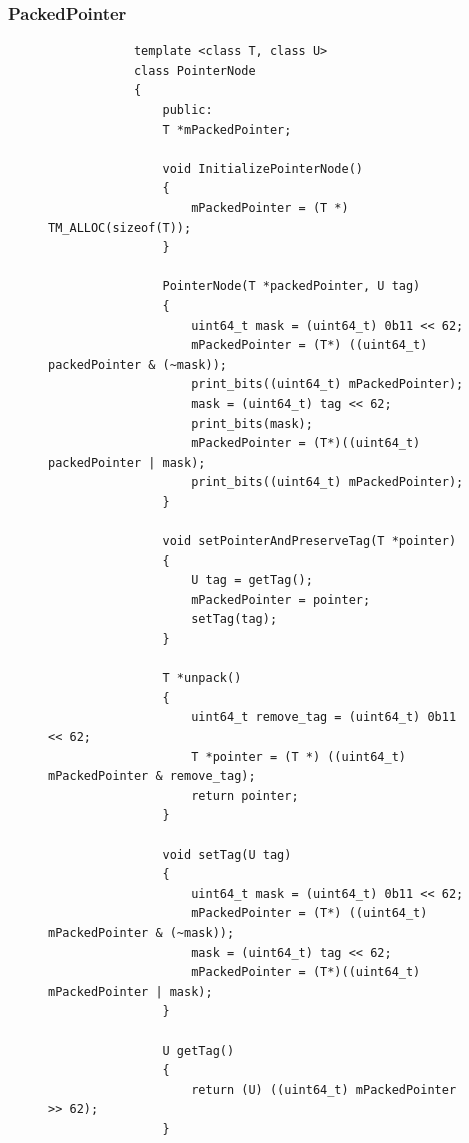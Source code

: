 \documentclass[letterpaper, 10 pt, conference]{ieeeconf}
\begin{document}
	\subsubsection{PackedPointer}
	\begin{figure}
		\begin{lstlisting}
			template <class T, class U>
			class PointerNode
			{
				public: 
				T *mPackedPointer;
				
				void InitializePointerNode()
				{
					mPackedPointer = (T *) TM_ALLOC(sizeof(T));
				}
				
				PointerNode(T *packedPointer, U tag)
				{
					uint64_t mask = (uint64_t) 0b11 << 62;
					mPackedPointer = (T*) ((uint64_t) packedPointer & (~mask));
					print_bits((uint64_t) mPackedPointer);
					mask = (uint64_t) tag << 62;
					print_bits(mask);
					mPackedPointer = (T*)((uint64_t) packedPointer | mask);
					print_bits((uint64_t) mPackedPointer);
				}
				
				void setPointerAndPreserveTag(T *pointer)
				{
					U tag = getTag();
					mPackedPointer = pointer;
					setTag(tag);
				}
				
				T *unpack()
				{
					uint64_t remove_tag = (uint64_t) 0b11 << 62;
					T *pointer = (T *) ((uint64_t) mPackedPointer & remove_tag);
					return pointer;
				}
				
				void setTag(U tag)
				{
					uint64_t mask = (uint64_t) 0b11 << 62;
					mPackedPointer = (T*) ((uint64_t) mPackedPointer & (~mask));
					mask = (uint64_t) tag << 62;
					mPackedPointer = (T*)((uint64_t) mPackedPointer | mask);
				}
				
				U getTag()
				{
					return (U) ((uint64_t) mPackedPointer >> 62);
				}
		\end{lstlisting}
	\end{figure}
	
\end{document}
